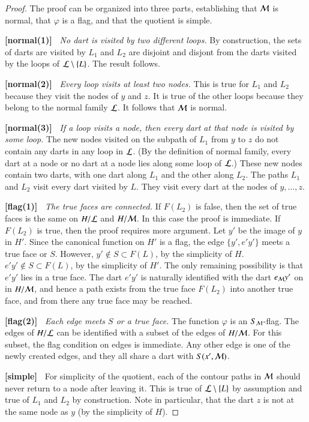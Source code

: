 \begin{proof}   The proof can be organized into three parts, establishing that ${\cal M}$ is normal, that $\varphi$ is a flag, and that the quotient is simple.

{\bf [normal(1)]~} {\it No dart is visited by two different loops.}  By construction, the sets of darts are visited by $L_1$ and $L_2$ are disjoint and disjont from the darts visited by the loops of ${\cal L}\setminus \{L\}$.  The result follows.  

{\bf [normal(2)]~} {\it Every loop visits at least two nodes.}  This is true for $L_1$ and $L_2$ because they visit the nodes of $y$ and $z$.  It is true of the other loops because they belong to the normal family ${\cal L}$. It follows that  ${\cal M}$ is normal.

{\bf [normal(3)]~} {\it If a loop visits a node, then every dart at that node is visited by some loop.}  The new nodes visited on the subpath of $L_1$ from $y$ to $z$ do not contain any darts in any loop in ${\cal L}$.  (By the definition of normal family, every dart at a node or no dart at a node lies along some loop of ${\cal L}$.)  These new nodes contain two darts, with one dart along $L_1$ and the other along $L_2$.   The paths $L_1$ and $L_2$ visit every dart visited by $L$.  They visit every dart at the nodes of $y,\ldots,z$.  

{\bf [flag(1)]~} {\it The true faces are connected.}   If $F(L_2)$ is false, then the set of true faces is the same on $H/{\cal L}$ and $H/{\cal M}$.  In this case the proof is immediate.  If $F(L_2)$ is true, then the proof requires more argument.  Let $y'$ be the image of $y$ in $H'$.  Since the canonical function on $H'$ is a flag, the edge $\{y',e'y'\}$ meets a true face or $S$.  However, $y'\not\in S\subset F(L)$, by the simplicity of $H$.  $e'y'\not\in S \subset F(L)$, by the simplicity of $H'$.  The only remaining possibility is that $e'y'$ lies in a true face.  The dart $e'y'$ is naturally identified with the dart $e_{\cal M} y'$ on in $H/{\cal M}$, and hence a path exists from the true face $F(L_2)$ into another true face, and from there any true face may be reached.

{\bf [flag(2)]~} {\it Each edge meets $S$ or a true face.}  
The function $\varphi$ is an $S_{\cal M}$-flag.  The edges of $H/{\cal L}$ can be identified with a subset of the edges of $H/{\cal M}$.   For this subset, the flag condition on edges is immediate.  Any other edge is one of the newly created edges, and they all share a dart with $S(x',{\cal M})$.  


{\bf [simple]~} For simplicity of the quotient, each of the contour paths in ${\cal M}$ should never return to a node after leaving it.  This is true of ${\cal L}\setminus\{L\}$ by assumption and true of $L_1$ and $L_2$ by construction.  Note in particular, that the dart $z$ is not at the same node as $y$ (by the simplicity of $H$).
\end{proof}


